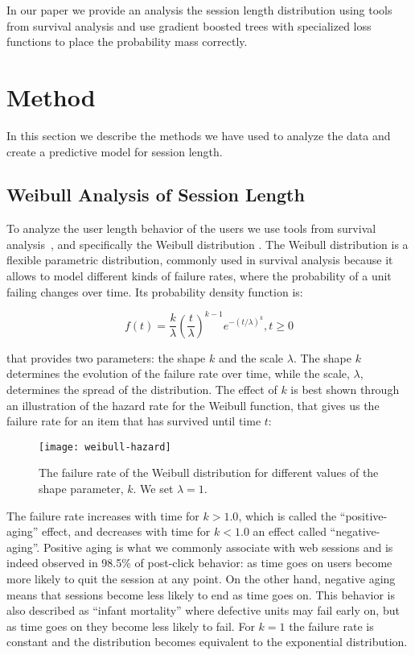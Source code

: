 In our paper we provide an analysis the session length distribution using
tools from survival analysis and use gradient boosted trees with specialized
loss functions to place the probability mass correctly.

\section{Method}
\label{sec:session-length-method}

In this section we describe the methods we have used to analyze the data
and create a predictive model for session length.

\subsection{Weibull Analysis of Session Length}

To analyze the user length behavior of the users we use tools from survival analysis~\cite{survival-analysis}, and specifically the Weibull distribution
\cite{weibull-survival}. The Weibull distribution is a flexible parametric distribution,
commonly used in survival analysis because it allows to model different kinds of failure
rates, where the probability of a unit failing changes over time. Its probability
density function is:

\begin{equation}
\label{eq:weibull-pdf}
f(t) = \frac{k}{\lambda}\left( \frac{t}{\lambda}\right)^{k-1}e^{-(t/\lambda)^k}, t \geq 0
\end{equation}



that provides two parameters: the shape $k$ and the scale $\lambda$. The shape $k$ determines
the evolution of the failure rate over time, while the scale, $\lambda$, determines the spread
of the distribution. The effect of $k$ is best shown through an illustration of the hazard rate
for the Weibull function, that gives us the failure rate for an item that has survived until time
$t$:

\begin{figure}[h]
	\centering
	\texttt{[image: weibull-hazard]}
	\caption{The failure rate of the Weibull distribution for different values of the shape parameter, $k$. We set $\lambda = 1$.}
	\label{fig:weibull-failure-rate}
\end{figure}

The failure rate increases with time for $k > 1.0$, which is called the ``positive-aging''
effect, and decreases with time for $k < 1.0$ an effect called ``negative-aging''. Positive aging
is what we commonly associate with web sessions and is indeed observed in 98.5\% of post-click
behavior\cite{weibull-web-browsing}: as time goes on users become more likely to quit the session
at any point. On the other hand, negative aging means that sessions become less likely to end
as time goes on. This behavior is also described as ``infant mortality'' where defective units
may fail early on, but as time goes on they become less likely to fail.
For $k = 1$ the failure rate is constant and the distribution becomes equivalent to the
exponential distribution.

